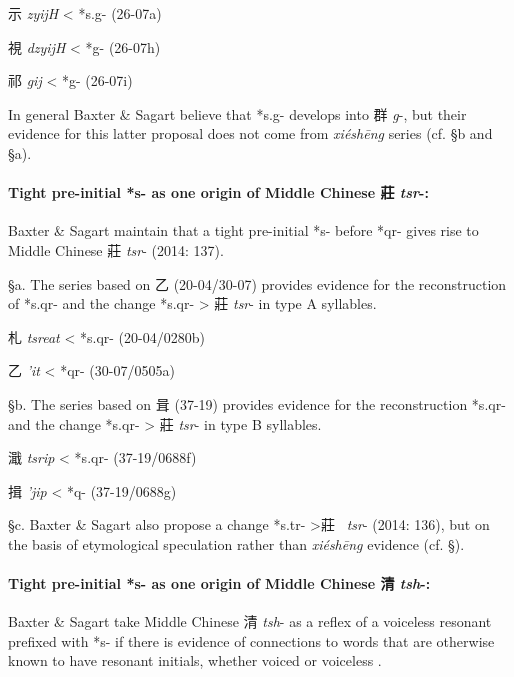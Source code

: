 \begin{description} \item
示  \emph{zyijH} \textless{} *s.g- (26-07a)
 \item
視  \emph{dzyijH} \textless{} *g- (26-07h)
 \item
祁  \emph{gij} \textless{} *g{}- (26-07i)
\end{description}

In general Baxter \& Sagart believe that *s.g- develops into 群
\emph{g}-, but their evidence for this latter proposal does not come
from  \emph{xiéshēng} series (cf. §b and §a).

\paragraph{Tight pre-initial *s- as one origin
of Middle Chinese 莊 \emph{\textbf{tsr}}\textbf{-:}} Baxter \& Sagart
maintain that a tight pre-initial *s- before *qr- gives rise to Middle
Chinese 莊 \emph{tsr}- (2014: 137).

§a. The series based on 乙 (20-04/30-07) provides evidence for the
reconstruction of *s.q{}r- and the change *s.q{}r- \textgreater{} 莊
 \emph{tsr}- in type A syllables.

\begin{description} \item
札  \emph{tsreat} \textless{} *s.q{}r- (20-04/0280b)

\item
乙  \emph{'it} \textless{} *qr- (30-07/0505a)
\end{description}

§b. The series based on 咠 (37-19) provides evidence for the
reconstruction *s.qr- and the change *s.qr- \textgreater{} 莊
 \emph{tsr}- in type B syllables.

\begin{description} \item
濈  \emph{tsrip} \textless{} *s.qr- (37-19/0688f)
\item
揖  \emph{'jip} \textless{} *q- (37-19/0688g)
\end{description}

§c. Baxter \& Sagart also propose a change *s.tr-
\textgreater{}莊~ \emph{tsr}- (2014: 136), but on the basis of
etymological speculation rather than  \emph{xiéshēng} evidence (cf. §).

\paragraph{Tight pre-initial *s- as one
origin of Middle Chinese 清  \emph{\textbf{tsh}}-: }Baxter \& Sagart take
Middle Chinese 清  \emph{tsh}- as a reflex of a voiceless resonant
prefixed with *s- if there is evidence of connections to words that are
otherwise known to have resonant initials, whether voiced or voiceless
\citeyearpar[149-150]{Baxter2014OldChinese}.

